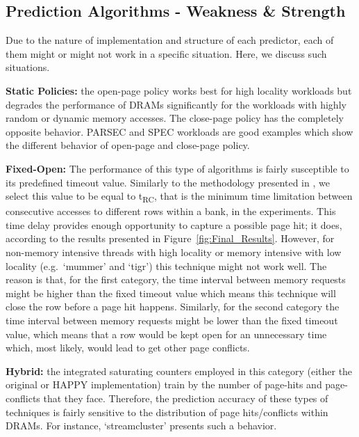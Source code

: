 \subsection{Prediction Algorithms - Weakness \& Strength}

Due to the nature of implementation and structure of each predictor, each of them might or might not work in a specific situation. Here, we discuss such situations.

{\bf Static Policies:} the open-page policy works best for high locality workloads but degrades the performance of DRAMs significantly for the workloads with highly random  or dynamic memory accesses. The close-page policy has the completely opposite behavior. PARSEC and SPEC workloads are good examples which show the different behavior of open-page and close-page policy.



{\bf Fixed-Open:} The performance of this type of algorithms is fairly susceptible to its predefined timeout value. Similarly to the methodology presented in \cite{kaseridis2011minimalist}, we select this value to be equal to t\textsubscript{RC}, that is the minimum time limitation between consecutive accesses to different rows within a bank, in the experiments. This time delay provides enough opportunity to capture a possible page hit; it does, according to the results presented in Figure~\ref{fig:Final_Results}. However, for non-memory intensive threads with high locality or memory intensive with low locality (e.g.\ `mummer' and `tigr') this technique might not work well. The reason is that, for the first category, the time interval between memory requests might be higher than the fixed timeout value which means this technique will close the row before a page hit happens. Similarly, for the second category the time interval between memory requests might be lower than the fixed timeout value, which means that a row would be kept open for an unnecessary time which, most likely, would lead to get other page conflicts.

{\bf Hybrid:} the integrated saturating counters employed in this category (either the original or HAPPY implementation) train by the number of page-hits and page-conflicts that they face. Therefore, the prediction accuracy of these types of techniques is fairly sensitive to the distribution of page hits/conflicts within DRAMs. For instance, `streamcluster'  presents such a behavior.  

